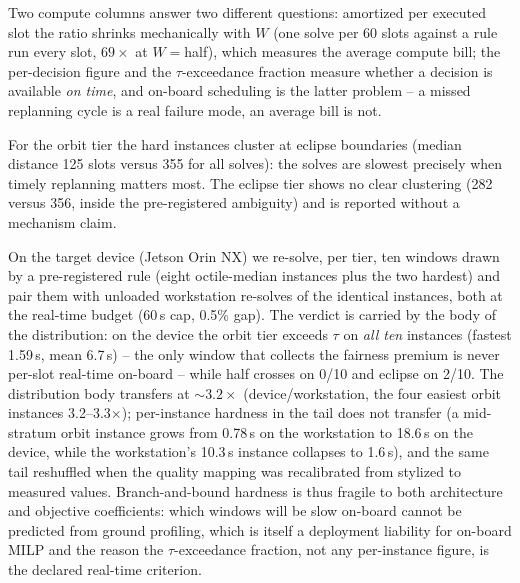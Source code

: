 Two compute columns answer two different questions: amortized per executed
slot the ratio shrinks mechanically with $W$ (one solve per 60 slots against
a rule run every slot, $69\times$ at $W{=}$half), which measures the average
compute bill; the per-decision figure and the $\tau$-exceedance fraction
measure whether a decision is available \emph{on time}, and on-board
scheduling is the latter problem -- a missed replanning cycle is a real
failure mode, an average bill is not.

For the orbit tier the hard instances cluster at eclipse boundaries (median
distance 125 slots versus 355 for all solves): the solves are slowest
precisely when timely replanning matters most. The eclipse tier shows no
clear clustering (282 versus 356, inside the pre-registered ambiguity) and
is reported without a mechanism claim.

On the target device (Jetson Orin NX) we re-solve, per tier, ten windows
drawn by a pre-registered rule (eight octile-median instances plus the two
hardest) and pair them with unloaded workstation re-solves of the identical
instances, both at the real-time budget (60\,s cap, 0.5\% gap). The verdict
is carried by the body of the distribution: on the device the orbit tier
exceeds $\tau$ on \emph{all ten} instances (fastest 1.59\,s, mean 6.7\,s) --
the only window that collects the fairness premium is never per-slot
real-time on-board -- while half crosses on 0/10 and eclipse on 2/10. The
distribution body transfers at ${\sim}3.2\times$ (device/workstation, the
four easiest orbit instances 3.2--3.3$\times$); per-instance hardness in the
tail does not transfer (a mid-stratum orbit instance grows from 0.78\,s on
the workstation to 18.6\,s on the device, while the workstation's
10.3\,s instance collapses to 1.6\,s), and the same tail reshuffled when
the quality mapping was recalibrated from stylized to measured values.
Branch-and-bound hardness is thus fragile to both architecture and
objective coefficients: which windows will be slow on-board cannot be
predicted from ground profiling, which is itself a deployment liability for
on-board MILP and the reason the $\tau$-exceedance fraction, not any
per-instance figure, is the declared real-time criterion.

